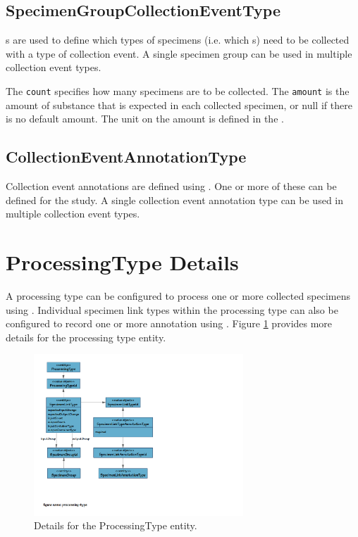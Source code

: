 \subsection*{SpecimenGroupCollectionEventType}

s are used to define which types
of specimens (i.e. which s) need to be collected with
a type of collection event. A single specimen group can be used in multiple
collection event types.

The \texttt{count} specifies how many specimens are to be collected. The
\texttt{amount} is the amount of substance that is expected in each collected
specimen, or null if there is no default amount. The unit on the amount is
defined in the .

\subsection*{CollectionEventAnnotationType}

Collection event annotations are defined using
. One or more of these can be
defined for the study. A single collection event annotation type can be used in
multiple collection event types.

\section{ProcessingType Details}
\label{sec:processing-type}

A processing type can be configured to process one or more collected specimens
using . Individual specimen link types within the
processing type can also be configured to record one or more annotation using
. Figure \ref{fig:processing-type}
provides more details for the processing type entity.

\begin{figure}[H]
  \centering
  \includegraphics[trim={9mm 48mm 120mm 9mm}, clip,
    width=0.7\textwidth]{images/processing-type}
  \caption{Details for the ProcessingType entity.}
  \label{fig:processing-type}
\end{figure}

